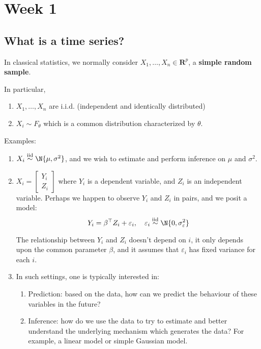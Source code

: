 \chapter{Week 1}
\section{What is a time series?}
In classical statistics, we normally consider $ X_1,\ldots,X_n\in\mathbf{R}^p $,
a \textbf{simple random sample}.

In particular,
\begin{enumerate}[(1)]
    \item $ X_1,\ldots,X_n $ are i.i.d. (independent and identically distributed)
    \item $ X_i \sim F_\theta $ which is a common distribution characterized
          by $ \theta $.
\end{enumerate}
Examples:
\begin{enumerate}
    \item $ X_i \stackrel{\text{iid}}{\sim} \N{\mu,\sigma^2} $, and we wish to estimate
          and perform inference on $ \mu $ and $ \sigma^2 $.
    \item $ X_i=\begin{bmatrix}
                  Y_i \\
                  Z_i
              \end{bmatrix} $ where $ Y_i $ is a dependent variable, and
          $ Z_i $ is an independent variable.
              {\color{blue}Perhaps we happen to observe
                  $ Y_i $ and $ Z_i $ in pairs, and we posit a model:}
          \[ Y_i=\beta^\top Z_i+\varepsilon_i,\quad\varepsilon_i
              \stackrel{\text{iid}}{\sim} \N{0,\sigma_{\varepsilon}^2} \]
          \begin{Remark}{}{}
              The relationship between $ Y_i $ and $ Z_i $ doesn't
              depend on $ i $, it only depends upon the common parameter
              $ \beta $, and it assumes that $ \varepsilon_i $ has fixed variance
              for each $ i $.
          \end{Remark}
    \item In such settings, one is typically interested in:
          \begin{enumerate}
              \item Prediction: {\color{blue} based on the data, how can we predict
                    the behaviour of these variables in the future?}
              \item Inference: {\color{blue}how do we use the data to try to estimate
                    and better understand the underlying mechanism which generates
                    the data? For example, a linear model or simple Gaussian model.}
          \end{enumerate}
\end{enumerate}
